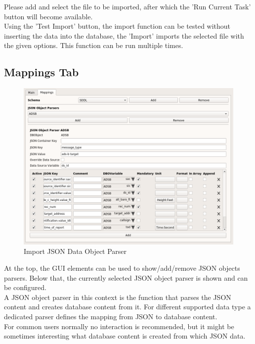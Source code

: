 Please add and select the file to be imported, after which the 'Run Current Task' button will become available. \\

Using the 'Test Import' button, the import function can be tested without inserting the data into the 
database, the 'Import' imports the selected file with the given options. This function can be run multiple times. \\

\subsection{Mappings Tab}

\begin{figure}[H]
  \center
    \includegraphics[width=16cm,frame]{figures/import_json_data_object_parser.png}
  \caption{Import JSON Data Object Parser}
\end{figure}

At the top, the GUI elements can be used to show/add/remove JSON objects parsers. Below that, the currently selected JSON object parser is shown and can be configured. \\

A JSON object parser in this context is the function that parses the JSON content and creates database content from it. For different supported  data type a dedicated parser defines the mapping from JSON to database content. \\

For common users normally no interaction is recommended, but it might be sometimes interesting what database content is created from which JSON data.

